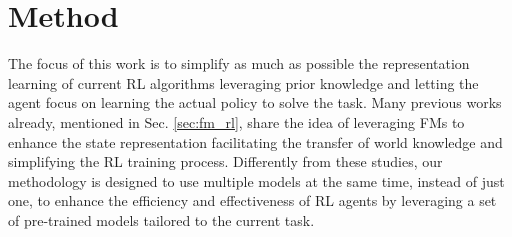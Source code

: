 
\chapter{Method}
\label{ch:method}

%
%








The focus of this work is to simplify as much as possible the representation learning of current RL algorithms leveraging prior knowledge and letting the agent focus on learning the actual policy to solve the task.
Many previous works already, mentioned in Sec. \ref{sec:fm_rl}, share the idea of leveraging FMs to enhance the state representation facilitating the transfer of world knowledge and simplifying the RL training process.
Differently from these studies, our methodology is designed to use multiple models at the same time, instead of just one, to enhance the efficiency and effectiveness of RL agents by leveraging a set of pre-trained models tailored to the current task.


